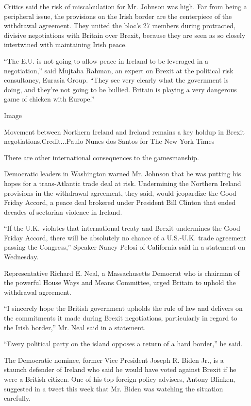 Critics said the risk of miscalculation for Mr. Johnson was high. Far
from being a peripheral issue, the provisions on the Irish border are
the centerpiece of the withdrawal agreement. They united the bloc's 27
members during protracted, divisive negotiations with Britain over
Brexit, because they are seen as so closely intertwined with maintaining
Irish peace.

``The E.U. is not going to allow peace in Ireland to be leveraged in a
negotiation,'' said Mujtaba Rahman, an expert on Brexit at the political
risk consultancy, Eurasia Group. ``They see very clearly what the
government is doing, and they're not going to be bullied. Britain is
playing a very dangerous game of chicken with Europe.''

Image

Movement between Northern Ireland and Ireland remains a key holdup in
Brexit negotiations.Credit...Paulo Nunes dos Santos for The New York
Times

There are other international consequences to the gamesmanship.

Democratic leaders in Washington warned Mr. Johnson that he was putting
his hopes for a trans-Atlantic trade deal at risk. Undermining the
Northern Ireland provisions in the withdrawal agreement, they said,
would jeopardize the Good Friday Accord, a peace deal brokered under
President Bill Clinton that ended decades of sectarian violence in
Ireland.

``If the U.K. violates that international treaty and Brexit undermines
the Good Friday Accord, there will be absolutely no chance of a
U.S.-U.K. trade agreement passing the Congress,'' Speaker Nancy Pelosi
of California said in a statement on Wednesday.

Representative Richard E. Neal, a Massachusetts Democrat who is chairman
of the powerful House Ways and Means Committee, urged Britain to uphold
the withdrawal agreement.

``I sincerely hope the British government upholds the rule of law and
delivers on the commitments it made during Brexit negotiations,
particularly in regard to the Irish border,'' Mr. Neal said in a
statement.

``Every political party on the island opposes a return of a hard
border,'' he said.

The Democratic nominee, former Vice President Joseph R. Biden Jr., is a
staunch defender of Ireland who said he would have voted against Brexit
if he were a British citizen. One of his top foreign policy advisers,
Antony Blinken, suggested in a tweet this week that Mr. Biden was
watching the situation carefully.

